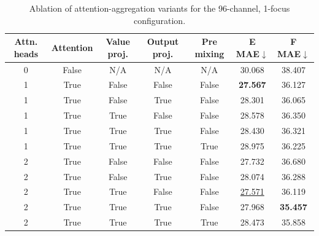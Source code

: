 \begin{table}[ht]
    \centering
    \scriptsize
    \caption{Ablation of attention-aggregation variants for the 96-channel, 1-focus configuration.}
    \label{tab:sm_attention_96}
    \begin{tabular*}{\linewidth}{@{\extracolsep{\fill}}ccccccc@{}}
        \toprule
        \textbf{Attn. heads}       & \textbf{Attention}         & \textbf{Value proj.} &
        \textbf{Output proj.}      & \textbf{Pre mixing}        &
        \textbf{E MAE}$\downarrow$ & \textbf{F MAE}$\downarrow$                                                                            \\
        \midrule
        0                          & False                      & N/A                  & N/A   & N/A   & 30.068          & 38.407          \\
        1                          & True                       & False                & False & False & \textbf{27.567} & 36.127          \\
        1                          & True                       & False                & True  & False & 28.301          & 36.065          \\
        1                          & True                       & True                 & False & False & 28.578          & 36.350          \\
        1                          & True                       & True                 & True  & False & 28.430          & 36.321          \\
        1                          & True                       & True                 & True  & True  & 28.975          & 36.225          \\
        2                          & True                       & False                & False & False & 27.732          & 36.680          \\
        2                          & True                       & False                & True  & False & 28.074          & 36.288          \\
        2                          & True                       & True                 & False & False & \underline{27.571} & 36.119          \\
        2                          & True                       & True                 & True  & False & 27.968          & \textbf{35.457} \\
        2                          & True                       & True                 & True  & True  & 28.473          & 35.858          \\

\end{tabular*}
\end{table}
